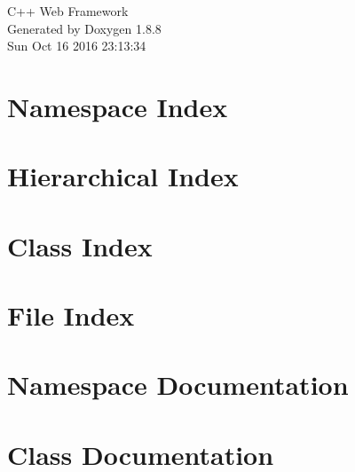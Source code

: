 \documentclass[twoside]{book}
\newcommand{\+}{\discretionary{\mbox{\scriptsize$\hookleftarrow$}}{}{}}
\newcommand{\clearemptydoublepage}{%
  \newpage{\pagestyle{empty}\cleardoublepage}%
}
\begin{document}
\hypersetup{pageanchor=false,
             bookmarks=true,
             bookmarksnumbered=true,
             pdfencoding=unicode
            }
\begin{titlepage}
\vspace*{7cm}
\begin{center}%
{\Large C++ Web Framework }\\
\vspace*{1cm}
{\large Generated by Doxygen 1.8.8}\\
\vspace*{0.5cm}
{\small Sun Oct 16 2016 23:13:34}\\
\end{center}
\end{titlepage}
\clearemptydoublepage
\tableofcontents
\clearemptydoublepage
{}
\hypersetup{pageanchor=true}

\chapter{Namespace Index}

\chapter{Hierarchical Index}

\chapter{Class Index}

\chapter{File Index}

\chapter{Namespace Documentation}

\chapter{Class Documentation}




























\end{document}
